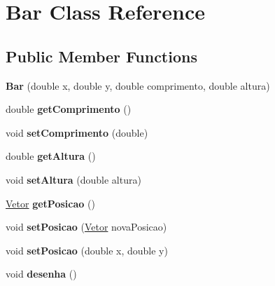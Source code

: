 \hypertarget{classBar}{\section{\-Bar \-Class \-Reference}
\label{classBar}
}
\subsection*{\-Public \-Member \-Functions}
\begin{DoxyCompactItemize}
\item 
\hypertarget{classBar_ab6db5d4a0f884d40dee0ac10db43486d}{{\bfseries \-Bar} (double x, double y, double comprimento, double altura)}\label{classBar_ab6db5d4a0f884d40dee0ac10db43486d}

\item 
\hypertarget{classBar_af73398f5748cca359bb8d2aa9a20611b}{double {\bfseries get\-Comprimento} ()}\label{classBar_af73398f5748cca359bb8d2aa9a20611b}

\item 
\hypertarget{classBar_a70ab3c19686edc2d1fb6e877c496b3d5}{void {\bfseries set\-Comprimento} (double)}\label{classBar_a70ab3c19686edc2d1fb6e877c496b3d5}

\item 
\hypertarget{classBar_a4aedc6c2ce49587217fb200f6826fbb9}{double {\bfseries get\-Altura} ()}\label{classBar_a4aedc6c2ce49587217fb200f6826fbb9}

\item 
\hypertarget{classBar_a0fac2212bc42aa6d637a382dedb66dab}{void {\bfseries set\-Altura} (double altura)}\label{classBar_a0fac2212bc42aa6d637a382dedb66dab}

\item 
\hypertarget{classBar_a0121532d69229eba63d095caf75fd39d}{\hyperlink{classVetor}{\-Vetor} {\bfseries get\-Posicao} ()}\label{classBar_a0121532d69229eba63d095caf75fd39d}

\item 
\hypertarget{classBar_a5cc985be97caac3c2c53d1bb361f46f2}{void {\bfseries set\-Posicao} (\hyperlink{classVetor}{\-Vetor} nova\-Posicao)}\label{classBar_a5cc985be97caac3c2c53d1bb361f46f2}

\item 
\hypertarget{classBar_afb2798fcf08b8b31dfcd914081f04920}{void {\bfseries set\-Posicao} (double x, double y)}\label{classBar_afb2798fcf08b8b31dfcd914081f04920}

\item 
\hypertarget{classBar_ae5c882a8f25e7dcb493868e82c800831}{void {\bfseries desenha} ()}\label{classBar_ae5c882a8f25e7dcb493868e82c800831}

\end{DoxyCompactItemize}
